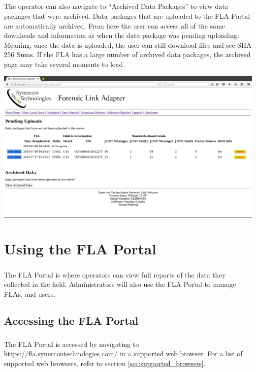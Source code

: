 \documentclass[11pt, oneside]{book}
\begin{document}
\paragraph{  }
The operator can also navigate to ``Archived Data Packages''
 to view data packages that were archived. Data
packages that are uploaded to the FLA Portal are automatically archived.
From here the user can access all of the same downloads and information
as when the data package was pending uploading. Meaning, once the
data is uploaded, the user can still download files and see SHA 256
Sums. If the FLA
has a large number of archived data packages, the archived page may
take several moments to load.
\begin{center}
\includegraphics[width=.9\linewidth]{../media/fla_preview_screenshots/archived_data}
\end{center}


\chapter{Using the FLA Portal}\label{sec:fla_portal}
\paragraph{  }
The FLA Portal is where operators can view full reports of the data
they collected in the field. Administrators will also use the FLA
Portal to manage FLAs, and users.


\section{Accessing the FLA Portal}
\paragraph{  }
The FLA Portal is accessed by navigating to \href{https://fla.synercontechnologies.com/}{https://fla.synercontechnologies.com/}
in a supported web browser. For a list of supported web browsers, refer to section \ref{sec:supported_browsers}.
\end{document}

